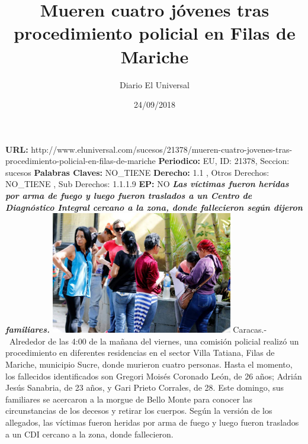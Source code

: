 \documentclass{article}%
\title{\textbf{Mueren cuatro jóvenes tras procedimiento policial en Filas de Mariche}}%
\author{Diario El Universal}%
\date{24/09/2018}%
\begin{document}
%
\normalsize%
\maketitle%
\textbf{URL: }%
http://www.eluniversal.com/sucesos/21378/mueren{-}cuatro{-}jovenes{-}tras{-}procedimiento{-}policial{-}en{-}filas{-}de{-}mariche\newline%
%
\textbf{Periodico: }%
EU, %
ID: %
21378, %
Seccion: %
sucesos\newline%
%
\textbf{Palabras Claves: }%
NO\_TIENE\newline%
%
\textbf{Derecho: }%
1.1%
, Otros Derechos: %
NO\_TIENE%
, Sub Derechos: %
1.1.1.9%
\newline%
%
\textbf{EP: }%
NO\newline%
\newline%
%
\textbf{\textit{Las víctimas fueron heridas por arma de fuego y luego fueron traslados a un Centro de Diagnóstico Integral cercano a la zona, donde fallecieron según dijeron familiares.}}%
\newline%
\newline%
%
\includegraphics[width=300px]{258.jpg}%
\newline%
%
Caracas.{-}~Alrededor de las 4:00 de la mañana del viernes, una comisión policial realizó un procedimiento en diferentes residencias en el sector Villa Tatiana, Filas de Mariche, municipio Sucre, donde murieron cuatro personas.%
\newline%
%
Hasta el momento, los fallecidos identificados son Gregori Moisés Coronado León, de 26 años; Adrián Jesús Sanabria, de 23 años, y Gari Prieto Corrales, de 28.%
\newline%
%
Este domingo, sus familiares se acercaron a la morgue de Bello Monte para conocer las circunstancias de los decesos y retirar los cuerpos.%
\newline%
%
Según la versión de los allegados, las víctimas fueron heridas por arma de fuego y luego fueron traslados a un CDI cercano a la zona, donde fallecieron.%
\newline%
\end{document}
